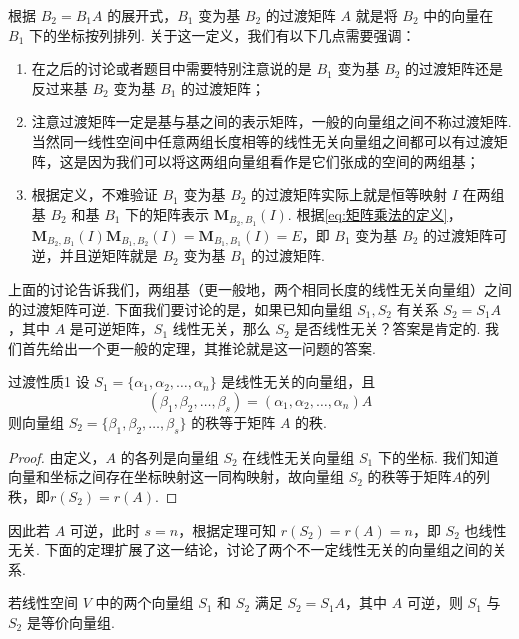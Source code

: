 根据 $B_2 = B_1A$ 的展开式，$B_1$ 变为基 $B_2$ 的过渡矩阵 $A$ 就是将 $B_2$ 中的向量在 $B_1$ 下的坐标按列排列. 关于这一定义，我们有以下几点需要强调：
\begin{enumerate}
    \item 在之后的讨论或者题目中需要特别注意说的是 $B_1$ 变为基 $B_2$ 的过渡矩阵还是反过来基 $B_2$ 变为基 $B_1$ 的过渡矩阵；

    \item 注意过渡矩阵一定是基与基之间的表示矩阵，一般的向量组之间不称过渡矩阵. 当然同一线性空间中任意两组长度相等的线性无关向量组之间都可以有过渡矩阵，这是因为我们可以将这两组向量组看作是它们张成的空间的两组基；

    \item 根据定义，不难验证 $B_1$ 变为基 $B_2$ 的过渡矩阵实际上就是恒等映射 $I$ 在两组基 $B_2$ 和基 $B_1$ 下的矩阵表示 $\mathbf{M}_{B_2,B_1}(I)$. 根据\autoref{eq:矩阵乘法的定义}，$\mathbf{M}_{B_2,B_1}(I)\mathbf{M}_{B_1,B_2}(I) = \mathbf{M}_{B_1,B_1}(I) = E$，即 $B_1$ 变为基 $B_2$ 的过渡矩阵可逆，并且逆矩阵就是 $B_2$ 变为基 $B_1$ 的过渡矩阵.
\end{enumerate}

上面的讨论告诉我们，两组基（更一般地，两个相同长度的线性无关向量组）之间的过渡矩阵可逆. 下面我们要讨论的是，如果已知向量组 $S_1, S_2$ 有关系 $S_2 = S_1A$，其中 $A$ 是可逆矩阵，$S_1$ 线性无关，那么 $S_2$ 是否线性无关？答案是肯定的. 我们首先给出一个更一般的定理，其推论就是这一问题的答案.
\begin{theorem}{}{过渡性质1}
    设 $S_1 = \{\alpha_1,\alpha_2,\ldots,\alpha_n\}$ 是线性无关的向量组，且
    \[(\beta_1,\beta_2,\ldots,\beta_s) = (\alpha_1,\alpha_2,\ldots,\alpha_n)A\]
    则向量组 $S_2 = \{\beta_1,\beta_2,\ldots,\beta_s\}$ 的秩等于矩阵 $A$ 的秩.
\end{theorem}

\begin{proof}
    由定义，$A$ 的各列是向量组 $S_2$ 在线性无关向量组 $S_1$ 下的坐标. 我们知道向量和坐标之间存在坐标映射这一同构映射，故向量组 $S_2$ 的秩等于矩阵$A$的列秩，即$r(S_2) = r(A)$.
\end{proof}

因此若 $A$ 可逆，此时 $s = n$，根据定理可知 $r(S_2) = r(A) = n$，即 $S_2$ 也线性无关. 下面的定理扩展了这一结论，讨论了两个不一定线性无关的向量组之间的关系.

\begin{theorem}{}{}
    若线性空间 $V$ 中的两个向量组 $S_1$ 和 $S_2$ 满足 $S_2 = S_1A$，其中 $A$ 可逆，则 $S_1$ 与 $S_2$ 是等价向量组.
\end{theorem}

